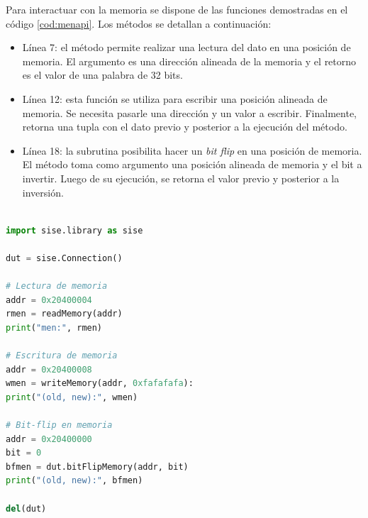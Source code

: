 Para interactuar con la memoria se dispone de las funciones demostradas en el código \ref{cod:menapi}.
Los métodos se detallan a continuación:
\begin{itemize}
    \item Línea 7: el método permite realizar una lectura del dato en una posición de memoria.
        El argumento es una dirección alineada de la memoria y el retorno es el valor de una palabra de 32 bits.
    \item Línea 12: esta función se utiliza para escribir una posición alineada de memoria.
        Se necesita pasarle una dirección y un valor a escribir.
        Finalmente, retorna una tupla con el dato previo y posterior a la ejecución del método.
    \item Línea 18: la subrutina posibilita hacer un \emph{bit flip} en una posición de memoria.
        El método toma como argumento una posición alineada de memoria y el bit a invertir.
        Luego de su ejecución, se retorna el valor previo y posterior a la inversión.
\end{itemize}

\begin{lstlisting}[language=Python,label=cod:menapi,caption=Ejemplo de uso en memoria.]  % Start your code-block

import sise.library as sise

dut = sise.Connection()

# Lectura de memoria
addr = 0x20400004
rmen = readMemory(addr)
print("men:", rmen)

# Escritura de memoria
addr = 0x20400008
wmen = writeMemory(addr, 0xfafafafa):
print("(old, new):", wmen)

# Bit-flip en memoria
addr = 0x20400000
bit = 0
bfmen = dut.bitFlipMemory(addr, bit)
print("(old, new):", bfmen)

del(dut)

\end{lstlisting}
